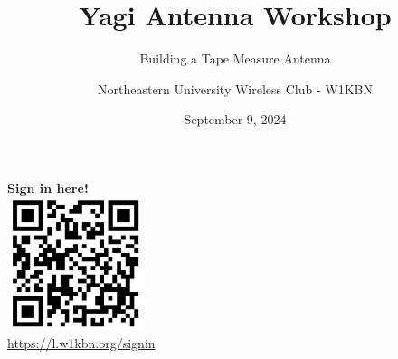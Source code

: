 \documentclass{beamer}
\title{Yagi Antenna Workshop}
\subtitle{Building a Tape Measure Antenna}
\author{Northeastern University Wireless Club - W1KBN}
\date{September 9, 2024}
\begin{document}
\begin{frame}
    \titlepage %
    \vspace{-1cm} %
    \begin{center}
        \textbf{Sign in here!} \\ %
        \includegraphics[width=0.30\textwidth]{images/qrcode.png} %
        \vspace{-0.3cm} %
        \\
        {\small \url{https://l.w1kbn.org/signin}} %
    \end{center}
\end{frame}
\end{document}

